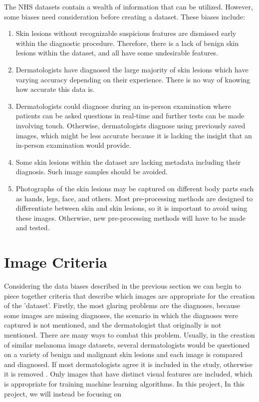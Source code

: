 The NHS datasets contain a wealth of information that can be utilized. However, some biases need consideration before creating a dataset. These biases include:
\begin{enumerate}
    \item Skin lesions without recognizable suspicious features are dismissed early within the diagnostic procedure. Therefore, there is a lack of benign skin lesions within the dataset, and all have some undesirable features.
    \item Dermatologists have diagnosed the large majority of skin lesions which have varying accuracy depending on their experience. There is no way of knowing how accurate this data is.
    \item Dermatologists could diagnose during an in-person examination where patients can be asked questions in real-time and further tests can be made involving touch. Otherwise, dermatologists diagnose using previously saved images, which might be less accurate because it is lacking the insight that an in-person examination would provide.
    \item Some skin lesions within the dataset are lacking metadata including their diagnosis. Such image samples should be avoided.
    \item Photographs of the skin lesions may be captured on different body parts such as hands, legs, face, and others. Most pre-processing methods are designed to differentiate between skin and skin lesions, so it is important to avoid using these images. Otherwise, new pre-processing methods will have to be made and tested.
\end{enumerate}

\section{Image Criteria}
Considering the data biases described in the previous section we can begin to piece together criteria that describe which images are appropriate for the creation of the 'dataset'. Firstly, the most glaring problems are the diagnoses, because some images are missing diagnoses, the scenario in which the diagnoses were captured is not mentioned, and the dermatologist that originally is not mentioned. There are many ways to combat this problem. Usually, in the creation of similar melanoma image datasets, several dermatologists would be questioned on a variety of benign and malignant skin lesions and each image is compared and diagnosed. If most dermatologists agree it is included in the study, otherwise it is removed \cite{}. Only images that have distinct visual features are included, which is appropriate for training machine learning algorithms. In this project, In this project, we will instead be focusing on 

